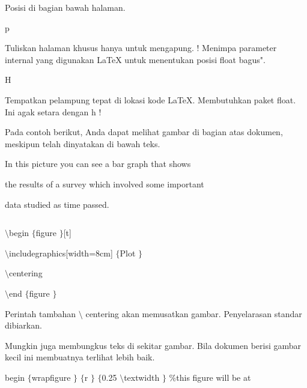 \noindent 
 Posisi di bagian bawah halaman. \par
\vspace{12pt}
\noindent 
p  \par
\noindent 
Tuliskan halaman khusus hanya untuk mengapung. ! Menimpa parameter internal yang digunakan LaTeX untuk menentukan posisi float bagus". \par
\vspace{12pt}
\noindent 
H \par
\noindent 
 Tempatkan pelampung tepat di lokasi kode LaTeX. Membutuhkan paket float. Ini agak setara dengan h ! \par
\vspace{14pt}
\vspace{14pt}
\vspace{18pt}
\noindent 
Pada contoh berikut, Anda dapat melihat gambar di bagian atas dokumen, meskipun telah dinyatakan di bawah teks. \par
\vspace{14pt}
\noindent 
In this picture you can see a bar graph that shows \par
\vspace{12pt}
\noindent 
the results of a survey which involved some important \par
\vspace{12pt}
\noindent 
data studied as time passed. \par
\noindent 
 $  $ \par
\noindent 
 $  \setminus $begin $  \{  $figure $  \}  $[t] \par
\vspace{12pt}
\noindent 
 $  \setminus $includegraphics[width=8cm] $  \{  $Plot $  \}  $ \par
\vspace{12pt}
\noindent 
 $  \setminus $centering \par
\vspace{12pt}
\noindent 
 $  \setminus $end $  \{  $figure $  \}  $ \par
\vspace{18pt}
\vspace{18pt}
\noindent 
Perintah tambahan  $  \setminus $ centering akan memusatkan gambar. Penyelarasan standar dibiarkan. \par
\noindent 
Mungkin juga membungkus teks di sekitar gambar. Bila dokumen berisi gambar kecil ini membuatnya terlihat lebih baik. \par
\vspace{22pt}
\noindent 
begin $  \{  $wrapfigure $  \}  $ $  \{  $r $  \}  $ $  \{  $0.25 $  \setminus $textwidth $  \}  $  $  \%  $this figure will be at  \par
